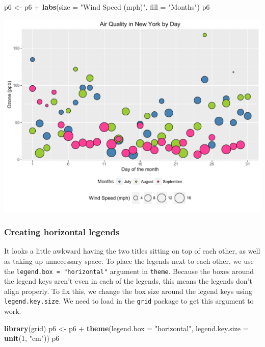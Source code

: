 \documentclass[]{article}
\newenvironment{Shaded}{\begin{snugshade}}{\end{snugshade}}
\newcommand{\KeywordTok}[1]{\textcolor[rgb]{0.13,0.29,0.53}{\textbf{{#1}}}}
\newcommand{\DataTypeTok}[1]{\textcolor[rgb]{0.13,0.29,0.53}{{#1}}}
\newcommand{\DecValTok}[1]{\textcolor[rgb]{0.00,0.00,0.81}{{#1}}}
\newcommand{\StringTok}[1]{\textcolor[rgb]{0.31,0.60,0.02}{{#1}}}
\newcommand{\NormalTok}[1]{{#1}}
\begin{document}
\begin{Shaded}
\begin{Highlighting}[]
\NormalTok{p6 <-}\StringTok{ }\NormalTok{p6 +}\StringTok{ }\KeywordTok{labs}\NormalTok{(}\DataTypeTok{size =} \StringTok{"Wind Speed (mph)"}\NormalTok{, }\DataTypeTok{fill =} \StringTok{"Months"}\NormalTok{)}
\NormalTok{p6}
\end{Highlighting}
\end{Shaded}

\begin{center}\includegraphics{0_all_posts_pdf/wscatter_15-1} \end{center}

\subsubsection{Creating horizontal
legends}\label{creating-horizontal-legends}

It looks a little awkward having the two titles sitting on top of each
other, as well as taking up unnecessary space. To place the legends next
to each other, we use the \texttt{legend.box\ =\ "horizontal"} argument
in \texttt{theme}. Because the boxes around the legend keys aren't even
in each of the legends, this means the legends don't align properly. To
fix this, we change the box size around the legend keys using
\texttt{legend.key.size}. We need to load in the \texttt{grid} package
to get this argument to work.

\begin{Shaded}
\begin{Highlighting}[]
\KeywordTok{library}\NormalTok{(grid) }
\NormalTok{p6 <-}\StringTok{ }\NormalTok{p6 +}\StringTok{ }\KeywordTok{theme}\NormalTok{(}\DataTypeTok{legend.box =} \StringTok{"horizontal"}\NormalTok{, }\DataTypeTok{legend.key.size =} \KeywordTok{unit}\NormalTok{(}\DecValTok{1}\NormalTok{, }\StringTok{"cm"}\NormalTok{))}
\NormalTok{p6}
\end{Highlighting}
\end{Shaded}
\end{document}
